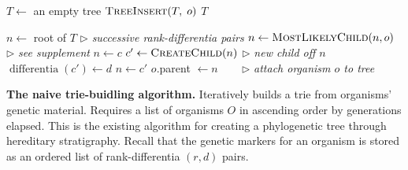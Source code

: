 \begin{algorithm}[h]
    \begin{algorithmic}[1]
    \small{
            \State $T \gets$ an empty tree
                \State $\textsc{TreeInsert}(T,\; o)$
            \EndFor
            \State \Return $T$
        \EndFunction

            \State $n \gets$ root of $T$
             \text{ } $\triangleright$ \textit{successive rank-differentia pairs}
                \State $n \gets \textsc{MostLikelyChild}(n, o)$ \text{ } $\triangleright$ \textit{see supplement}
                    \State $n \gets c$
                \Else
                    \State $c' \gets \textsc{CreateChild}(n)$ \text{ } $\triangleright$ \textit{new child off $n$}
                    \State $\operatorname{differentia}(c') \gets d$
                    \State $n \gets c'$
                \EndIf
            \EndFor
            \State $o$.parent $\gets n$ ~~~ $\triangleright$ \textit{attach organism $o$ to tree}
        \EndFunction
    }
    \end{algorithmic}
    \caption{\textbf{The naive trie-buidling algorithm.} \small Iteratively builds a trie from organisms' genetic material. Requires a list of organisms $O$ in ascending order by generations elapsed. This is the existing algorithm for creating a phylogenetic tree through hereditary stratigraphy. Recall that the genetic markers for an organism is stored as an ordered list of rank-differentia $(r, d)$ pairs. \vspace{-1.5em}}
    \label{alg:old}
\end{algorithm}
